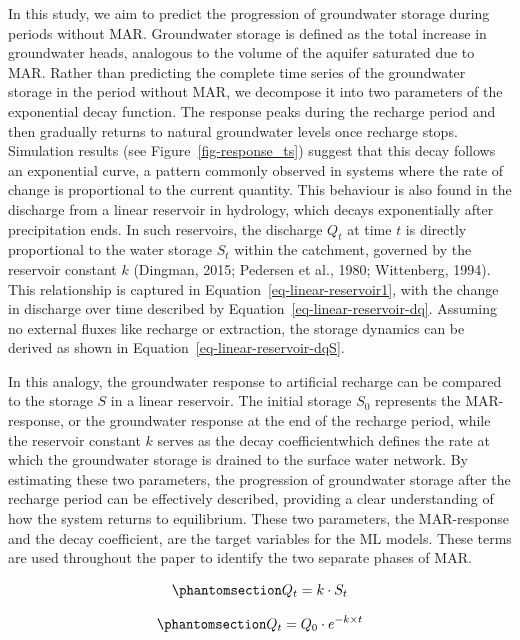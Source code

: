 \documentclass[
]{agujournal2019}
\begin{document}
In this study, we aim to predict the progression of groundwater storage
during periods without MAR. Groundwater storage is defined as the total
increase in groundwater heads, analogous to the volume of the aquifer
saturated due to MAR. Rather than predicting the complete time series of
the groundwater storage in the period without MAR, we decompose it into
two parameters of the exponential decay function. The response peaks
during the recharge period and then gradually returns to natural
groundwater levels once recharge stops. Simulation results (see
Figure~\ref{fig-response_ts}) suggest that this decay follows an
exponential curve, a pattern commonly observed in systems where the rate
of change is proportional to the current quantity. This behaviour is
also found in the discharge from a linear reservoir in hydrology, which
decays exponentially after precipitation ends. In such reservoirs, the
discharge \(Q_t\) at time \(t\) is directly proportional to the water
storage \(S_t\) within the catchment, governed by the reservoir constant
\(k\) (Dingman, 2015; Pedersen et al., 1980; Wittenberg, 1994). This
relationship is captured in Equation~\ref{eq-linear-reservoir1}, with
the change in discharge over time described by
Equation~\ref{eq-linear-reservoir-dq}. Assuming no external fluxes like
recharge or extraction, the storage dynamics can be derived as shown in
Equation~\ref{eq-linear-reservoir-dqS}.

In this analogy, the groundwater response to artificial recharge can be
compared to the storage \(S\) in a linear reservoir. The initial storage
\(S_0\) represents the MAR-response, or the groundwater response at the
end of the recharge period, while the reservoir constant \(k\) serves as
the decay coefficientwhich defines the rate at which the groundwater
storage is drained to the surface water network. By estimating these two
parameters, the progression of groundwater storage after the recharge
period can be effectively described, providing a clear understanding of
how the system returns to equilibrium. These two parameters, the
MAR-response and the decay coefficient, are the target variables for the
ML models. These terms are used throughout the paper to identify the two
separate phases of MAR.

\begin{equation}\phantomsection\label{eq-linear-reservoir1}{
Q_t = k \cdot S_t
}\end{equation}

\begin{equation}\phantomsection\label{eq-linear-reservoir-dq}{
Q_t = Q_0 \cdot e^{-k \times t}
}\end{equation}
\end{document}
